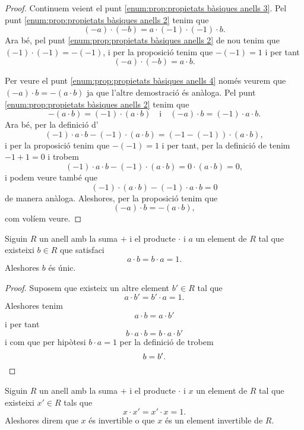 \documentclass[../Apunts.tex]{subfiles}
\begin{document}
\begin{proposition}
\begin{proof}
			Continuem veient el punt \eqref{enum:prop:propietats bàsiques anells 3}. Pel punt \eqref{enum:prop:propietats bàsiques anells 2} tenim que
			\[(-a)\cdot(-b)=a\cdot (-1)\cdot(-1)\cdot b.\]
			Ara bé, pel punt \eqref{enum:prop:propietats bàsiques anells 2} de nou tenim que \((-1)\cdot(-1)=-(-1)\), i per la proposició  tenim que \(-(-1)=1\) i per tant
			\[(-a)\cdot(-b)=a\cdot b.\]
			
			Per veure el punt \eqref{enum:prop:propietats bàsiques anells 4} només veurem que \((-a)\cdot b=-(a\cdot b)\) ja que l'altre demostració és anàloga. Pel punt \eqref{enum:prop:propietats bàsiques anells 2} tenim que
			\[-(a\cdot b)=(-1)\cdot(a\cdot b)\quad{\text{i}}\quad(-a)\cdot b=(-1)\cdot a\cdot b.\]
			Ara bé, per la definició d'
			\[(-1)\cdot a\cdot b-(-1)\cdot(a\cdot b)=(-1-(-1))\cdot(a\cdot b),\]
			i per la proposició  tenim que \(-(-1)=1\) i per tant, per la definició de  tenim \(-1+1=0\) i trobem
			\[(-1)\cdot a\cdot b-(-1)\cdot(a\cdot b)=0\cdot(a\cdot b)=0,\]
			i podem veure també que
			\[(-1)\cdot(a\cdot b)-(-1)\cdot a\cdot b=0\]
			de manera anàloga. Aleshores, per la proposició  tenim que
			\[(-a)\cdot b=-(a\cdot b),\]
			com volíem veure.
		\end{proof}
	\end{proposition}
	\begin{proposition}
		\label{prop:unicitat invers en anells}
		Siguin \(R\) un anell amb la suma \(+\) i el producte \(\cdot\) i \(a\) un element de \(R\) tal que existeixi \(b\in R\) que satisfaci
		\[a\cdot b=b\cdot a=1.\]
		Aleshores \(b\) és únic.
		\begin{proof}
			Suposem que existeix un altre element \(b'\in R\) tal que
			\[a\cdot b'=b'\cdot a=1.\]
			Aleshores tenim
			\[a\cdot b=a\cdot b'\]
			i per tant
			\[b\cdot a\cdot b=b\cdot a\cdot b'\]
			i com que per hipòtesi \(b\cdot a=1\) per la definició de  trobem
			\[b=b'.\qedhere\]
		\end{proof}
	\end{proposition}
	\begin{definition}
		\label{def:element invertible pel producte d'un anell}
		Siguin \(R\) un anell amb la suma \(+\) i el producte \(\cdot\) i \(x\) un element de \(R\) tal que existeixi \(x'\in R\) tals que
		\[x\cdot x'=x'\cdot x=1.\] 
		Aleshores direm que \(x\) és invertible o que \(x\) és un element invertible de \(R\).
	\end{definition}
\end{document}
